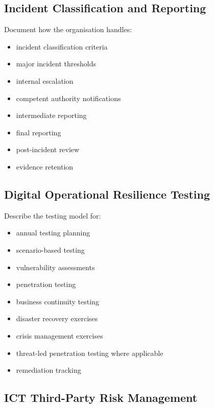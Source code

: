 \documentclass[
  letterpaper,
  DIV=11,
  numbers=noendperiod]{scrartcl}
\providecommand{\tightlist}{%
  \setlength{\itemsep}{0pt}\setlength{\parskip}{0pt}}
\begin{document}
\subsection{Incident Classification and
Reporting}\label{incident-classification-and-reporting}

Document how the organisation handles:

\begin{itemize}
\tightlist
\item
  incident classification criteria
\item
  major incident thresholds
\item
  internal escalation
\item
  competent authority notifications
\item
  intermediate reporting
\item
  final reporting
\item
  post-incident review
\item
  evidence retention
\end{itemize}

\subsection{Digital Operational Resilience
Testing}\label{digital-operational-resilience-testing}

Describe the testing model for:

\begin{itemize}
\tightlist
\item
  annual testing planning
\item
  scenario-based testing
\item
  vulnerability assessments
\item
  penetration testing
\item
  business continuity testing
\item
  disaster recovery exercises
\item
  crisis management exercises
\item
  threat-led penetration testing where applicable
\item
  remediation tracking
\end{itemize}

\subsection{ICT Third-Party Risk
Management}\label{ict-third-party-risk-management}
\end{document}
